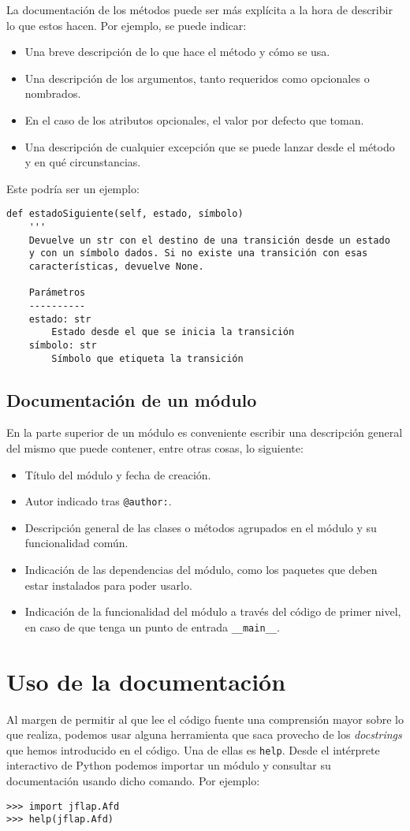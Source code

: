 La documentación de los métodos puede ser más explícita a la hora de describir lo que estos hacen. Por ejemplo, se puede indicar:
\begin{itemize}
	\item Una breve descripción de lo que hace el método y cómo se usa.
	\item Una descripción de los argumentos, tanto requeridos como opcionales o nombrados.
	\item En el caso de los atributos opcionales, el valor por defecto que toman.
	\item Una descripción de cualquier excepción que se puede lanzar desde el método y en qué circunstancias.
\end{itemize}

Este podría ser un ejemplo:
\begin{lstlisting}
def estadoSiguiente(self, estado, símbolo)
    '''
    Devuelve un str con el destino de una transición desde un estado
    y con un símbolo dados. Si no existe una transición con esas 
    características, devuelve None.
	
    Parámetros
    ----------
    estado: str
        Estado desde el que se inicia la transición
    símbolo: str
        Símbolo que etiqueta la transición
\end{lstlisting}

\subsection{Documentación de un módulo}

En la parte superior de un módulo es conveniente escribir una descripción general del mismo que puede contener, entre otras cosas, lo siguiente:
\begin{itemize}
	\item Título del módulo y fecha de creación.
	\item Autor indicado tras \texttt{@author:}.
	\item Descripción general de las clases o métodos agrupados en el módulo y su funcionalidad común.
	\item Indicación de las dependencias del módulo, como los paquetes que deben estar instalados para poder usarlo.
	\item Indicación de la funcionalidad del módulo a través del código de primer nivel, en caso de que tenga un punto de entrada \texttt{\_\_main\_\_}.
\end{itemize}

\section{Uso de la documentación}

Al margen de permitir al que lee el código fuente una comprensión mayor sobre lo que realiza, podemos usar alguna herramienta que saca provecho de los \emph{docstrings} que hemos introducido en el código. Una de ellas es \texttt{help}. Desde el intérprete interactivo de Python podemos importar un módulo y consultar su documentación usando dicho comando. Por ejemplo:

\begin{lstlisting}
>>> import jflap.Afd
>>> help(jflap.Afd)
\end{lstlisting}
